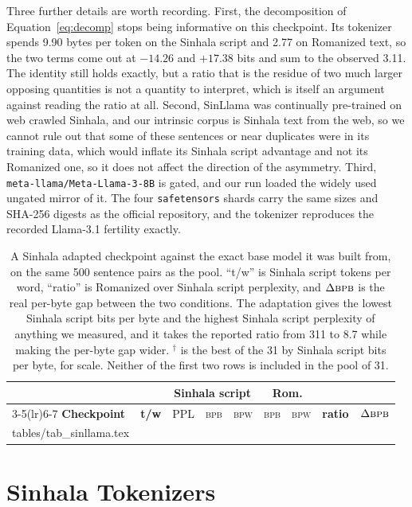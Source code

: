 \documentclass[11pt]{article}
\makeatletter
\newcommand{\bpb}{\textsc{bpb}}
\newcommand{\bpw}{\textsc{bpw}}
\newcommand{\rows}[1]{\@@input #1 }
\makeatother
\begin{document}
Three further details are worth recording. First, the decomposition of
Equation~\ref{eq:decomp} stops being informative on this checkpoint. Its tokenizer
spends 9.90 bytes per token on the Sinhala script and 2.77 on Romanized text, so the two
terms come out at $-14.26$ and $+17.38$ bits and sum to the observed 3.11. The identity
still holds exactly, but a ratio that is the residue of two much larger opposing
quantities is not a quantity to interpret, which is itself an argument against reading
the ratio at all. Second, SinLlama was continually pre-trained on web crawled Sinhala,
and our intrinsic corpus is Sinhala text from the web, so we cannot rule out that some
of these sentences or near duplicates were in its training data, which would inflate its
Sinhala script advantage and not its Romanized one, so it does not affect the direction
of the asymmetry. Third, \texttt{meta-llama/Meta-Llama-3-8B} is gated, and our run loaded
the widely used ungated mirror of it. The four \texttt{safetensors} shards carry the same
sizes and SHA-256 digests as the official repository, and the tokenizer reproduces the
recorded Llama-3.1 fertility exactly.

\begin{table}[t]
\centering\scriptsize
\setlength{\tabcolsep}{2.4pt}
\begin{tabular}{@{}l r r rr rr r r@{}}
\toprule
& & \multicolumn{3}{c}{\textbf{Sinhala script}} & \multicolumn{2}{c}{\textbf{Rom.}}
& & \\
\cmidrule(lr){3-5}\cmidrule(lr){6-7}
\textbf{Checkpoint} & \textbf{t/w} & PPL & \bpb{} & \bpw{} & \bpb{} & \bpw{}
& \textbf{ratio} & \boldmath$\Delta\bpb$ \\
\midrule
\rows{tables/tab_sinllama.tex}
\bottomrule
\end{tabular}
\caption{A Sinhala adapted checkpoint against the exact base model it was built from,
on the same 500 sentence pairs as the pool. ``t/w'' is Sinhala script tokens per word,
``ratio'' is Romanized over Sinhala script perplexity, and $\Delta\bpb$ is the real
per-byte gap between the two conditions. The adaptation gives the lowest Sinhala script
bits per byte and the highest Sinhala script perplexity of anything we measured, and it
takes the reported ratio from 311 to 8.7 while making the per-byte gap wider.
$^{\dagger}$ is the best of the 31 by Sinhala script bits per byte, for scale. Neither
of the first two rows is included in the pool of 31.}
\label{tab:sinllama}
\end{table}

\section{Sinhala Tokenizers}
\label{sec:tokenizers}
\end{document}
